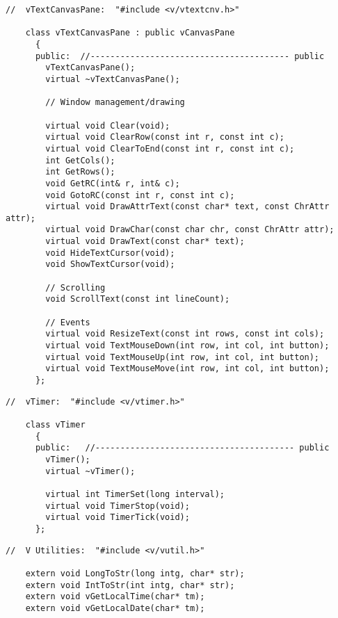 \footnotesize
\begin{verbatim}
//  vTextCanvasPane:  "#include <v/vtextcnv.h>"

    class vTextCanvasPane : public vCanvasPane
      {
      public:  //---------------------------------------- public
        vTextCanvasPane();
        virtual ~vTextCanvasPane();

        // Window management/drawing

        virtual void Clear(void);
        virtual void ClearRow(const int r, const int c);
        virtual void ClearToEnd(const int r, const int c);
        int GetCols();
        int GetRows();
        void GetRC(int& r, int& c);
        void GotoRC(const int r, const int c);
        virtual void DrawAttrText(const char* text, const ChrAttr attr);
        virtual void DrawChar(const char chr, const ChrAttr attr);
        virtual void DrawText(const char* text);
        void HideTextCursor(void);
        void ShowTextCursor(void);

        // Scrolling
        void ScrollText(const int lineCount);

        // Events
        virtual void ResizeText(const int rows, const int cols);
        virtual void TextMouseDown(int row, int col, int button);
        virtual void TextMouseUp(int row, int col, int button);
        virtual void TextMouseMove(int row, int col, int button);
      };
\end{verbatim}
\normalfont\normalsize


\footnotesize
\begin{verbatim}
//  vTimer:  "#include <v/vtimer.h>"

    class vTimer
      {
      public:   //---------------------------------------- public
        vTimer();
        virtual ~vTimer();

        virtual int TimerSet(long interval);
        virtual void TimerStop(void);
        virtual void TimerTick(void);
      };
\end{verbatim}
\normalfont\normalsize


\footnotesize
\begin{verbatim}
//  V Utilities:  "#include <v/vutil.h>"

    extern void LongToStr(long intg, char* str);
    extern void IntToStr(int intg, char* str);
    extern void vGetLocalTime(char* tm);
    extern void vGetLocalDate(char* tm);
\end{verbatim}
\normalfont\normalsize

